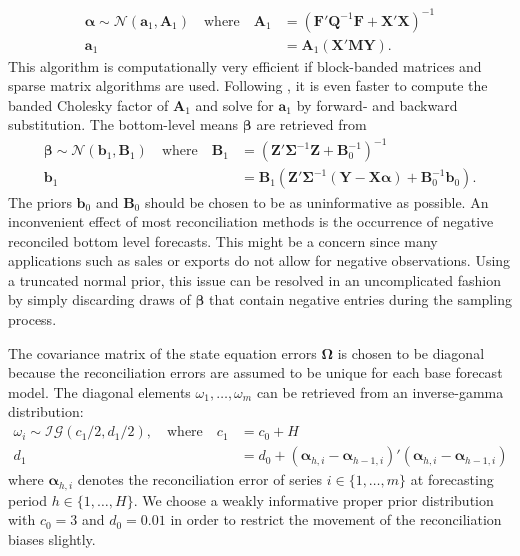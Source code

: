 \documentclass[a4paper,fleqn,11pt]{article}
\begin{document}
\begin{align*}
	\boldsymbol{\alpha} \sim \mathcal{N}(\textbf{a}_1, \textbf{A}_1) \quad \text{where} \quad \textbf{A}_1 &= (\textbf{F}'\textbf{Q}^{-1}\textbf{F} + \textbf{X}'\textbf{X})^{-1} \\
	\textbf{a}_1 &= \textbf{A}_1 (\textbf{X}'\textbf{M}\textbf{Y}).
\end{align*}
This algorithm is computationally very efficient if block-banded matrices and sparse matrix algorithms are used. Following \cite{Chan2009}, it is even faster to compute the banded Cholesky factor of $\textbf{A}_1$ and solve for $\textbf{a}_1$ by forward- and backward substitution. The bottom-level means $\boldsymbol{\beta}$ are retrieved from
\begin{align*}
	\boldsymbol{\beta} \sim \mathcal{N}(\textbf{b}_1,\textbf{B}_1) \quad \text{where} \quad \textbf{B}_1 &= \left(\textbf{Z}'\boldsymbol{\Sigma}^{-1}\textbf{Z} + \textbf{B}_0^{-1} \right)^{-1}\\
	 \textbf{b}_1 &= \textbf{B}_1 \left(\textbf{Z}'\boldsymbol{\Sigma}^{-1} (\textbf{Y} - \textbf{X}\boldsymbol{\alpha}) + \textbf{B}_0^{-1} \textbf{b}_0 \right).
\end{align*}
The priors $\textbf{b}_0$ and $\textbf{B}_0$ should be chosen to be as uninformative as possible. An inconvenient effect of most reconciliation methods is the occurrence of negative reconciled bottom level forecasts. This might be a concern since many applications such as sales or exports do not allow for negative observations. Using a truncated normal prior, this issue can be resolved in an uncomplicated fashion by simply discarding draws of $\boldsymbol{\beta}$ that contain negative entries during the sampling process.

The covariance matrix of the state equation errors $\boldsymbol{\Omega}$ is chosen to be diagonal because the reconciliation errors are assumed to be unique for each base forecast model. The diagonal elements $\omega_1, \hdots, \omega_m$ can be retrieved from an inverse-gamma distribution:
\begin{align*}
\omega_i \sim \mathcal{IG}(c_1/2,d_1/2), \quad \text{where} \quad c_1 &= c_0 + H\\
	d_1 &= d_0 + (\boldsymbol{\alpha}_{h,i} - \boldsymbol{\alpha}_{h-1,i})'(\boldsymbol{\alpha}_{h,i} - \boldsymbol{\alpha}_{h-1,i})
\end{align*}
where $\boldsymbol{\alpha}_{h,i}$ denotes the reconciliation error of series $i \in \{1, \hdots, m \}$ at forecasting period $h \in \{1, \hdots, H\}$. We choose a weakly informative proper prior distribution with $c_0 = 3$ and $d_0 = 0.01$ in order to restrict the movement of the reconciliation biases slightly. 
\end{document}
